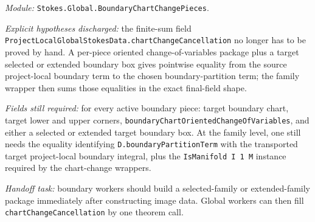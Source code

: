 \begin{definition}
  \label{anc:m6_boundary_chart_change_pieces}
  \leanok
  \emph{Module:} \texttt{Stokes.Global.BoundaryChartChangePieces}.

  \emph{Explicit hypotheses discharged:}
  the finite-sum field
  \texttt{ProjectLocalGlobalStokesData.chartChangeCancellation} no longer has
  to be proved by hand.  A per-piece oriented change-of-variables package plus
  a target selected or extended boundary box gives pointwise equality from the
  source project-local boundary term to the chosen boundary-partition term; the
  family wrapper then sums those equalities in the exact final-field shape.

  \emph{Fields still required:}
  for every active boundary piece: target boundary chart, target lower and
  upper corners, \texttt{boundaryChartOrientedChangeOfVariables}, and either a
  selected or extended target boundary box.  At the family level, one still
  needs the equality identifying \texttt{D.boundaryPartitionTerm} with the
  transported target project-local boundary integral, plus the
  \texttt{IsManifold I 1 M} instance required by the chart-change wrappers.

  \emph{Handoff task:}
  boundary workers should build a selected-family or extended-family package
  immediately after constructing image data.  Global workers can then fill
  \texttt{chartChangeCancellation} by one theorem call.
\end{definition}

